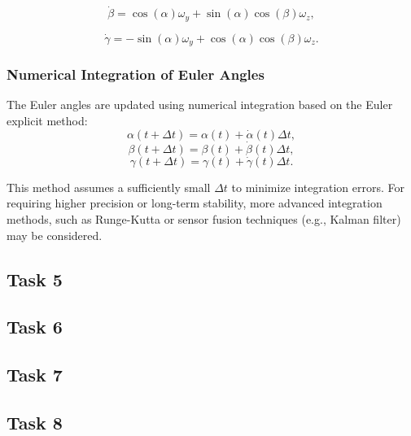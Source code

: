 \documentclass[12pt]{article}
\begin{document}
\begin{equation}
\label{eq:beta_corrected}
\dot{\beta} = \cos(\alpha) \omega_y + \sin(\alpha) \cos(\beta) \omega_z,
\end{equation}

\begin{equation}
\label{eq:gamma_corrected}
\dot{\gamma} = -\sin(\alpha) \omega_y + \cos(\alpha) \cos(\beta) \omega_z.
\end{equation}


\subsubsection{Numerical Integration of Euler Angles}

The Euler angles are updated using numerical integration based on the Euler explicit method:
\begin{equation}
\label{eq:integration_alpha}
\alpha(t + \Delta t) = \alpha(t) + \dot{\alpha}(t) \Delta t,
\end{equation}
\begin{equation}
\label{eq:integration_beta}
\beta(t + \Delta t) = \beta(t) + \dot{\beta}(t) \Delta t,
\end{equation}
\begin{equation}
\label{eq:integration_gamma}
\gamma(t + \Delta t) = \gamma(t) + \dot{\gamma}(t) \Delta t.
\end{equation}

This method assumes a sufficiently small \(\Delta t\) to minimize integration errors. For requiring higher precision or long-term stability, more advanced integration methods, such as Runge-Kutta or sensor fusion techniques (e.g., Kalman filter) may be considered.


\subsection{Task 5}


\subsection{Task 6}


\subsection{Task 7}


\subsection{Task 8}
\end{document}
